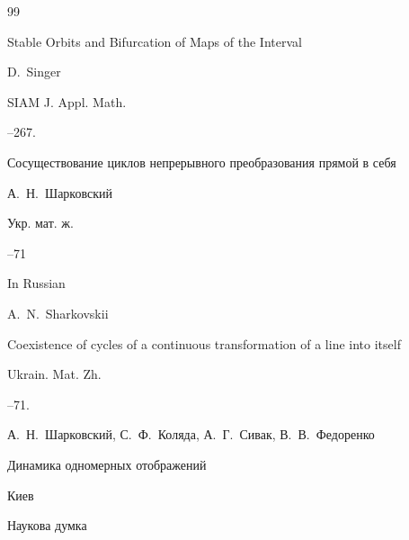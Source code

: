 \begin{thebibliography}{99}







\paper Stable Orbits and Bifurcation of Maps of the Interval

\by D.~Singer

\jour SIAM J. Appl. Math.




--267.





\paper Сосуществование циклов непрерывного преобразования прямой в себя

\by А.~Н.~Шарковский

\jour Укр. мат. ж.





--71

\misctransl

\lang In Russian

\by A.~N.~Sharkovskii

\paper Coexistence of cycles of a continuous transformation of a line into itself

\jour Ukrain. Mat. Zh.




–71.






\by А.~Н.~Шарковский, С.~Ф.~Коляда, А.~Г.~Сивак, В.~В.~Федоренко

\book Динамика одномерных отображений

\publaddr Киев

\publ Наукова думка



\transl


\end{thebibliography}

